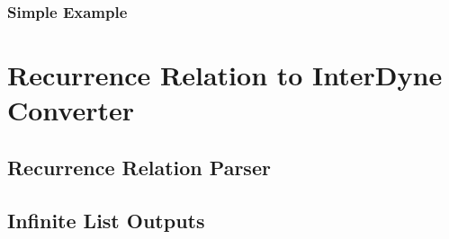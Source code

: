\documentclass{article}
\begin{document}


\subsubsection{Simple Example}




\section{Recurrence Relation to InterDyne Converter} 





\subsection{Recurrence Relation Parser}




\subsection{Infinite List Outputs}
\end{document}
